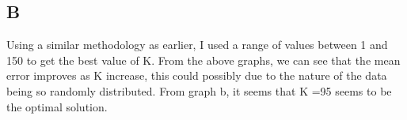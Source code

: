\documentclass[11pt]{article} %
\begin{document}
\subsection{B}
\begin{figure}[h]
\centering
{}
\qquad
{}
\qquad
\end{figure}
Using a similar methodology as earlier, I used a range of values between 1 and 150 to get the best value of K. From the above graphs, we can see that the mean error improves as K increase, this could possibly due to the nature of the data being so randomly distributed. From graph b, it seems that K =95 seems to be the optimal solution.
\end{document}
